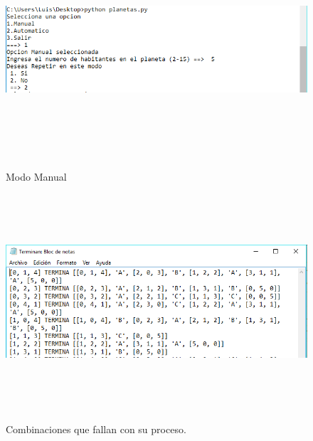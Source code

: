 \documentclass[12pt]{article}
\begin{document}
\begin{figure}[H]
\begin{center}
\includegraphics[width=\textwidth, height=8cm]{manual_planetas}
\label{ }
\caption{Modo Manual}
\end{center}
\end{figure}

\begin{figure}[H]
\begin{center}
\includegraphics[width=\textwidth, height=8cm]{manual_planetas_fallan}
\label{ }
\caption{Combinaciones que fallan con su proceso.}
\end{center}
\end{figure}
\end{document}
